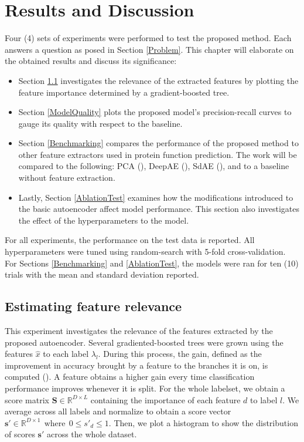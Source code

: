 \chapter{Results and Discussion}
\label{Results}

Four (4) sets of experiments were performed to test the proposed method.
Each answers a question as posed in Section \ref{Problem}.
This chapter will elaborate on the obtained results and discuss its
significance: 

\begin{itemize}
    \item Section \ref{FeatureRelevance} investigates the relevance of the
        extracted features by plotting the feature importance determined by a
        gradient-boosted tree.
    \item Section \ref{ModelQuality} plots the proposed model's
        precision-recall curves to gauge its quality with respect to the
        baseline.
    \item Section \ref{Benchmarking} compares the performance of the
        proposed method to other feature extractors used in protein function
        prediction. The work will be compared to the following: PCA
        (\cite{wang2013protein}), DeepAE (\cite{chicco2014deep}),
        SdAE (\cite{miranda2017feature}), and to a baseline without feature
        extraction.
    \item Lastly, Section \ref{AblationTest} examines how the modifications introduced
        to the basic autoencoder affect model performance. This section also
        investigates the effect of the hyperparameters to the model.
\end{itemize}

For all experiments, the performance on the test data is reported. All
hyperparameters were tuned using random-search with 5-fold cross-validation.
For Sections \ref{Benchmarking} and \ref{AblationTest}, the
models were ran for ten (10) trials with the mean and standard deviation
reported. 

\section{Estimating feature relevance}
\label{FeatureRelevance}

\par This experiment investigates the relevance of the features extracted by
the proposed autoencoder. Several gradiented-boosted trees were grown using the
features $\widehat{x}$ to each label $\lambda_l$. During this process, the
gain, defined as the improvement in accuracy brought by a feature to the
branches it is on, is computed (\cite{dmlc2015feature}). A feature obtains a
higher gain every time classification performance improves whenever it is
split. For the whole labelset, we obtain a score matrix $\mathbf{S} \in
\mathbb{R}^{D \times L}$ containing the importance of each feature $d$ to label
$l$. We average across all labels and normalize to obtain a score vector
$\mathbf{s'} \in \mathbb{R}^{D \times 1} ~~\text{where}~~ 0 \leq s'_d \leq 1$.
Then, we plot a histogram to show the distribution of scores $\mathbf{s'}$
across the whole dataset.

